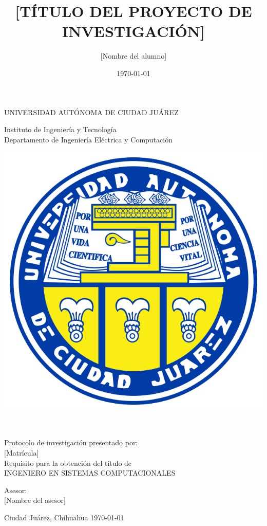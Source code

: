 \documentclass[final,12pt]{article}
\title{[TÍTULO DEL PROYECTO DE INVESTIGACIÓN]}
\author{[Nombre del alumno]}
\date{\today}
\begin{document}
	\thispagestyle{empty}
\begin{center} \vfill
{\Large UNIVERSIDAD AUTÓNOMA DE CIUDAD JUÁREZ}\\
\vspace{6mm}
{\large Instituto de Ingeniería y Tecnología\\
\vspace{6mm}
Departamento de Ingeniería Eléctrica y Computación
\vspace{20mm}

\includegraphics [scale=0.7]{images/escudo-uacj} 
\vspace{10mm}






\thetitle\\
\vspace{15mm}


Protocolo de investigación presentado por:\\
\vspace{6mm}
\theauthor\hspace{10mm} [Matrícula]\\
\vspace{10mm}
Requisito para la obtención del título de\\
\vspace{6mm}
INGENIERO EN SISTEMAS COMPUTACIONALES\\
\vspace{10mm}

Asesor:\\
{[Nombre del asesor]}\\
} \vfill
	Ciudad Juárez, Chihuahua \hspace{70mm}\today

\end{center} 
\end{document}
